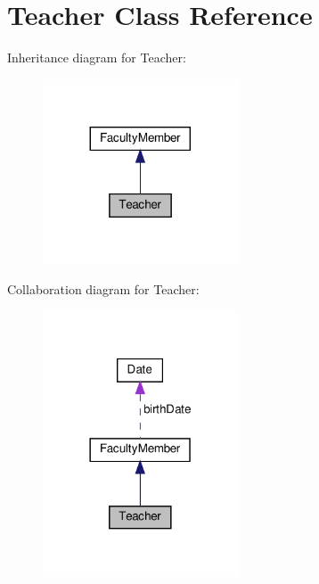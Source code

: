 \hypertarget{classTeacher}{}\section{Teacher Class Reference}
\label{classTeacher}


Inheritance diagram for Teacher\+:\nopagebreak
\begin{figure}[H]
\begin{center}
\leavevmode
\includegraphics[width=164pt]{classTeacher__inherit__graph}
\end{center}
\end{figure}


Collaboration diagram for Teacher\+:\nopagebreak
\begin{figure}[H]
\begin{center}
\leavevmode
\includegraphics[width=165pt]{classTeacher__coll__graph}
\end{center}
\end{figure}
